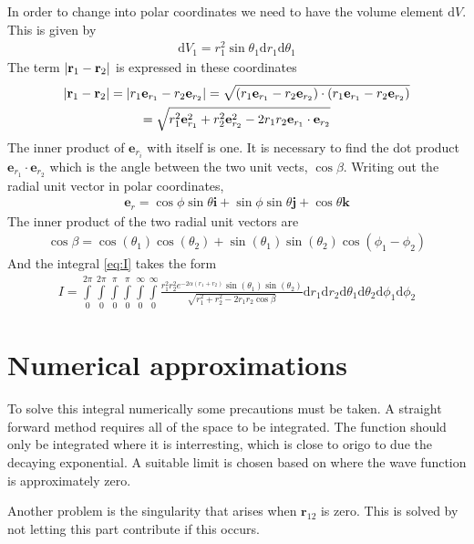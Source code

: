 \documentclass[11pt,a4paper,english,final]{article}
\numberwithin{equation}{section}
\newcommand{\ve}[1]{\mathbf{#1}} %
\newcommand{\di}{\mathrm{d}}
\begin{document}
In order to change into polar coordinates we need to have the volume 
element $\di V$. This is given by 
\begin{gather}
\di V_1 = r_1^2\sin\theta_1 \di r_1\di\theta_1
\end{gather}
The term $\abs{\ve{r}_1 - \ve{r}_2}$ is expressed in these coordinates
\begin{gather}
\abs{\ve{r}_1 - \ve{r}_2} = \abs{r_1 \ve{e}_{r_1} - r_2\ve{e}_{r_2}}
 = \sqrt{(r_1 \ve{e}_{r_1} -  r_2\ve{e}_{r_2})\cdot 
 (r_1 \ve{e}_{r_1} - r_2\ve{e}_{r_2})}\\
 = \sqrt{r_1^2\ve{e}_{r_1}^2 + r_2^2\ve{e}_{r_2}^2  
 - 2r_1r_2 \ve{e}_{r_1}\cdot \ve{e}_{r_2}}
\end{gather}
The inner product of $\ve{e}_{r_i}$ with itself is one. It is necessary 
to find the dot product $\ve{e}_{r_1}\cdot \ve{e}_{r_2}$ which is the 
angle between the two unit vects, $\cos\beta$.
Writing out the radial unit vector in 
polar coordinates,
\begin{gather}
\ve{e}_r = \cos\phi\sin\theta \ve{i} + \sin\phi\sin\theta\ve{j} 
+ \cos\theta\ve{k}
\end{gather}
The inner product of the two radial unit vectors are 
\begin{gather}
\cos\beta = \cos(\theta_1)\cos(\theta_2)
+ \sin(\theta_1)\sin(\theta_2)\cos(\phi_1 - \phi_2)
\label{eq:cosbeta}
\end{gather}
And the integral \eqref{eq:I} takes the form
\begin{gather} I = 
\int\limits_0^{2\pi}\!\int\limits_0^{2\pi}\!
\int\limits_0^\pi\!\int\limits_0^\pi\!
\int\limits_0^\infty\!\int\limits_0^\infty 
\frac{r_1^2r_2^2 e^{-2\alpha(r_1 + r_2)} \sin(\theta_1)\sin(\theta_2)
}{\sqrt{ r_1^2 + r_2^2 - 2r_1r_2\cos\beta }}
\di r_1\di r_2\di\theta_1 \di\theta_2 \di\phi_1 \di\phi_2
\label{eq:IR}
\end{gather}

\section{Numerical approximations}

To solve this integral numerically some precautions must be taken.
A straight forward method requires all of the space to be integrated. 
The function should only be integrated where it is interresting, which 
is close to origo to due the decaying exponential. A suitable limit 
is chosen based on where the wave function is approximately zero.

Another problem is the singularity that arises when $\ve{r}_{12}$ is zero. 
This is solved by not letting this part contribute if this occurs.
\end{document}

